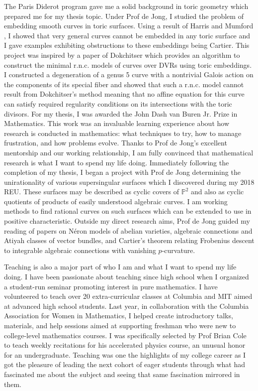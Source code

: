 \documentclass[11pt]{article}
\begin{document}
The Paris Diderot program gave me a solid background in toric geometry which prepared me for my thesis topic. Under Prof  de Jong, I studied the problem of embedding smooth curves in toric surfaces. Using a result of Harris and Mumford , I showed that very general curves cannot be embedded in any toric surface and I gave examples exhibiting obstructions to these embeddings being Cartier. This project was inspired by a paper of Dokchitser  which provides an algorithm to construct the minimal r.n.c. models of curves over DVRs using toric embeddings. I constructed a degeneration of a genus 5 curve with a nontrivial Galois action on the components of its special fiber and showed that such a r.n.c. model cannot result from Dokchitser's method meaning that no affine equation for this curve can satisfy required regularity conditions on its intersections with the toric divisors. For my thesis, I was awarded the John Dash van Buren Jr. Prize in Mathematics. This work was an invaluable learning experience about how research is conducted in mathematics: what techniques to try, how to manage frustration, and how problems evolve. Thanks to Prof de Jong’s excellent mentorship and our working relationship, I am fully convinced that mathematical research is what I want to spend my life doing. Immediately following the completion of my thesis, I began a project with Prof de Jong determining the unirationality of various supersingular surfaces which I discovered during my 2018 REU. These surfaces may be described as cyclic covers of $\mathbb{P}^2$ and also as cyclic quotients of products of easily understood algebraic curves. I am working methods to find rational curves on such surfaces which can be extended to use in positive characteristic. Outside my direct research aims, Prof de Jong guided my reading of papers on N\'{e}ron models of abelian varieties, algebraic connections and Atiyah classes of vector bundles, and Cartier's theorem relating Frobenius descent to integrable algebraic connections with vanishing $p$-curvature.
\par
Teaching is also a major part of who I am and what I want to spend my life doing. I have been passionate about teaching since high school when I organized a student-run seminar promoting interest in pure mathematics. I have volunteered to teach over 20 extra-curricular classes at Columbia and MIT aimed at advanced high school students. Last year, in collaboration with the Columbia Association for Women in Mathematics, I helped create introductory talks, materials, and help sessions aimed at supporting freshman who were new to college-level mathematics courses. I was specifically selected by Prof Brian Cole to teach weekly recitations for  his accelerated physics course, an unusual honor for an undergraduate. Teaching was one the highlights of my college career as I got the pleasure of leading the next cohort of eager students through what had fascinated me about the subject and seeing that same fascination mirrored in them.
\end{document}
